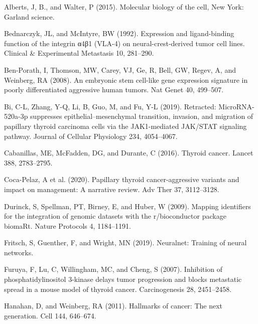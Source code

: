 \documentclass[
  parskip,
  oneside]{scrreprt}
\newlength{\cslhangindent}
\newlength{\cslentryspacingunit} %
\newenvironment{CSLReferences}[2] %
 {%
  \setlength{\parindent}{0pt}
  \ifodd #1
  \let\oldpar\par
  \def\par{\hangindent=\cslhangindent\oldpar}
  \fi
  \setlength{\parskip}{#2\cslentryspacingunit}
 }%
 {}
\begin{document}
\hypertarget{refs}{}
\begin{CSLReferences}{0}{0}
\leavevmode{}%
Alberts, J, B., and Walter, P (2015). Molecular biology of the cell, New
York: Garland science.

\leavevmode{}%
Bednarczyk, JL, and McIntyre, BW (1992). Expression and ligand-binding
function of the integrin α4β1 (VLA-4) on neural-crest-derived tumor cell
lines. Clinical \& Experimental Metastasis 10, 281--290.

\leavevmode{}%
Ben-Porath, I, Thomson, MW, Carey, VJ, Ge, R, Bell, GW, Regev, A, and
Weinberg, RA (2008). An embryonic stem cell-like gene expression
signature in poorly differentiated aggressive human tumors. Nat Genet
40, 499--507.

\leavevmode{}%
Bi, C-L, Zhang, Y-Q, Li, B, Guo, M, and Fu, Y-L (2019). Retracted:
MicroRNA-520a-3p suppresses epithelial--mesenchymal transition,
invasion, and migration of papillary thyroid carcinoma cells via the
JAK1-mediated JAK/STAT signaling pathway. Journal of Cellular Physiology
234, 4054--4067.

\leavevmode{}%
Cabanillas, ME, McFadden, DG, and Durante, C (2016). Thyroid cancer.
Lancet 388, 2783--2795.

\leavevmode{}%
Coca-Pelaz, A et al. (2020). Papillary thyroid cancer-aggressive
variants and impact on management: A narrative review. Adv Ther 37,
3112--3128.

\leavevmode{}%
Durinck, S, Spellman, PT, Birney, E, and Huber, W (2009). Mapping
identifiers for the integration of genomic datasets with the
r/bioconductor package biomaRt. Nature Protocols 4, 1184--1191.

\leavevmode{}%
Fritsch, S, Guenther, F, and Wright, MN (2019). Neuralnet: Training of
neural networks.

\leavevmode{}%
Furuya, F, Lu, C, Willingham, MC, and Cheng, S (2007). Inhibition of
phosphatidylinositol 3-kinase delays tumor progression and blocks
metastatic spread in a mouse model of thyroid cancer. Carcinogenesis 28,
2451--2458.

\leavevmode{}%
Hanahan, D, and Weinberg, RA (2011). Hallmarks of cancer: The next
generation. Cell 144, 646--674.


\end{CSLReferences}
\end{document}
